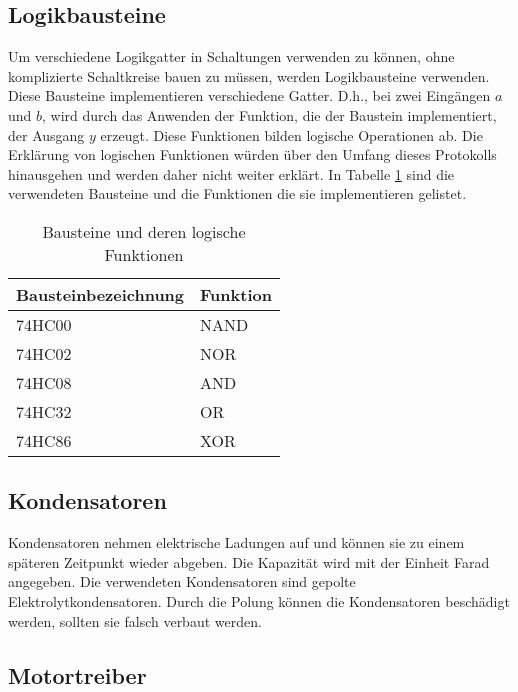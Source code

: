 \subsection{Logikbausteine}
\label{subsec:logikbausteine}

Um verschiedene Logikgatter in Schaltungen verwenden zu können, ohne komplizierte Schaltkreise bauen zu müssen, werden Logikbausteine verwenden.
Diese Bausteine implementieren verschiedene Gatter.
D.h., bei zwei Eingängen $a$ und $b$, wird durch das Anwenden der Funktion, die der Baustein implementiert, der Ausgang $y$ erzeugt.
Diese Funktionen bilden logische Operationen ab.
Die Erklärung von logischen Funktionen würden über den Umfang dieses Protokolls hinausgehen und werden daher nicht weiter erklärt.
In Tabelle \ref{tab:bausteine-und-deren-logische-funktionen} sind die verwendeten Bausteine und die Funktionen die sie implementieren gelistet.

\begin{table}[ht]
    \centering
    \caption{Bausteine und deren logische Funktionen}
    \label{tab:bausteine-und-deren-logische-funktionen}
    \begin{tabular}{| l | l |}
        \hline
        Bausteinbezeichnung & Funktion \\
        \hline
        74HC00              & NAND     \\
        74HC02              & NOR      \\
        74HC08              & AND      \\
        74HC32              & OR       \\
        74HC86              & XOR      \\
        \hline
    \end{tabular}
\end{table}

\subsection{Kondensatoren \cite{kondesator}}
\label{subsec:kondensatoren}

Kondensatoren nehmen elektrische Ladungen auf und können sie zu einem späteren Zeitpunkt wieder abgeben.
Die Kapazität wird mit der Einheit Farad angegeben.
Die verwendeten Kondensatoren sind gepolte Elektrolytkondensatoren.
Durch die Polung können die Kondensatoren beschädigt werden, sollten sie falsch verbaut werden.

\subsection{Motortreiber}
\label{subsec:motortreiber}

